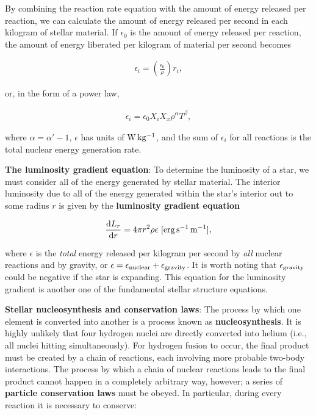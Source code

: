 \documentclass[a4paper,10pt]{article}
\begin{document}
{\noindent}By combining the reaction rate equation with the amount of energy released per reaction, we can calculate the amount of energy released per second in each kilogram of stellar material. If $\epsilon_0$ is the amount of energy released per reaction, the amount of energy liberated per kilogram of material per second becomes

\begin{align*}
    \epsilon_i = \left(\frac{\epsilon_0}{\rho}\right) r_i,
\end{align*}

{\noindent}or, in the form of a power law,

\begin{align*}
    \epsilon_i = \epsilon_0X_iX_x\rho^\alpha T^\beta,
\end{align*}

{\noindent}where $\alpha=\alpha'-1$, $\epsilon$ has units of ${\rm W\,kg^{-1}}$, and the sum of $\epsilon_i$ for all reactions is the total nuclear energy generation rate. 

{\noindent}\textbf{The luminosity gradient equation}: To determine the luminosity of a star, we must consider all of the energy generated by stellar material. The interior luminosity due to all of the energy generated within the star's interior out to some radius $r$ is given by the \textbf{luminosity gradient equation}

\begin{align*}
    \frac{{\rm d}L_r}{{\rm d}r} = 4\pi r^2\rho\epsilon ~ [{\rm erg\,s^{-1}\,m^{-1}}],
\end{align*}

{\noindent}where $\epsilon$ is the \textit{total} energy released per kilogram per second by \textit{all} nuclear reactions and by gravity, or $\epsilon=\epsilon_{\rm nuclear}+\epsilon_{\rm gravity}$. It is worth noting that $\epsilon_{\rm gravity}$ could be negative if the star is expanding. This equation for the luminosity gradient is another one of the fundamental stellar structure equations.

{\noindent}\textbf{Stellar nucleosynthesis and conservation laws}: The process by which one element is converted into another is a process known as \textbf{nucleosynthesis}. It is highly unlikely that four hydrogen nuclei are directly converted into helium (i.e., all nuclei hitting simultaneously). For hydrogen fusion to occur, the final product must be created by a chain of reactions, each involving more probable two-body interactions. The process by which a chain of nuclear reactions leads to the final product cannot happen in a completely arbitrary way, however; a series of \textbf{particle conservation laws} must be obeyed. In particular, during every reaction it is necessary to conserve:
\end{document}
